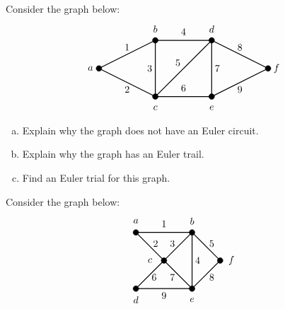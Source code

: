 \documentclass[12pt,letterpaper]{exam}
\begin{document}
\begin{questions}
\newpage
\question[10]  Consider the graph below:
	\[
	\begin{tikzpicture}
	\draw[line width=0.03cm] (0,2) -- (-2,1) -- (0,0);
	\draw[line width=0.03cm] (2,2) -- (0,2) -- (0,0) -- (2,0) -- (4,1) -- (2,2) -- (2,0);
	\draw[line width=0.03cm] (0,0) -- (2,2);
	
	\draw[fill=black] (-2,1) circle (0.1);
	\draw[fill=black] (0,0) circle (0.1);
	\draw[fill=black] (0,2) circle (0.1);
	\draw[fill=black] (2,0) circle (0.1);
	\draw[fill=black] (2,2) circle (0.1);
	\draw[fill=black] (4,1) circle (0.1);
	
	\node at (-2.3,1) {$a$};
	\node at (0,2.4) {$b$};
	\node at (0,-0.4) {$c$};
	\node at (2,2.4) {$d$};
	\node at (2,-0.4) {$e$};
	\node at (4.3,1) {$f$};
	
	\node at (-1,1.75) {$1$};
	\node at (-1,0.25) {$2$};
	\node at (-0.2,1) {$3$};
	\node at (1,2.3) {$4$};
	\node at (0.8,1.2) {$5$};
	\node at (1,0.3) {$6$};
	\node at (2.2,1) {$7$};
	\node at (3,1.75) {$8$};
	\node at (3,0.25) {$9$};
	\end{tikzpicture}
	\]

\begin{enumerate}[(a)]
\item Explain why the graph does not have an Euler circuit. 
\item Explain why the graph has an Euler trail. 
\item Find an Euler trial for this graph. 
\end{enumerate}



\newpage
\question[10] Consider the graph below:
	\[
	\begin{tikzpicture}
	\draw[line width=0.03cm] (2,2) -- (3,1) -- (2,0) -- (2,2) -- (0,2) -- (1,1) -- (0,0) -- (2,0) -- (1,1) -- (2,2);
	
	\draw[fill=black] (0,0) circle (0.1);
	\draw[fill=black] (2,0) circle (0.1);
	\draw[fill=black] (0,2) circle (0.1);
	\draw[fill=black] (2,2) circle (0.1);
	\draw[fill=black] (1,1) circle (0.1);
	\draw[fill=black] (3,1) circle (0.1);
	
	\node at (0,2.4) {$a$};
	\node at (2,2.4) {$b$};
	\node at (0.5,1) {$c$};
	\node at (0,-0.4) {$d$};
	\node at (2,-0.4) {$e$};
	\node at (3.4,1) {$f$};
	
	\node at (1,2.3) {$1$};
	\node at (0.7,1.6) {$2$};
	\node at (1.3,1.6) {$3$};
	\node at (2.2,1) {$4$};
	\node at (2.7,1.6) {$5$};
	\node at (0.65,0.4) {$6$};
	\node at (1.3,0.4) {$7$};
	\node at (2.7,0.4) {$8$};
	\node at (1,-0.25) {$9$};
	\end{tikzpicture}
	\]


\end{questions}
\end{document}

